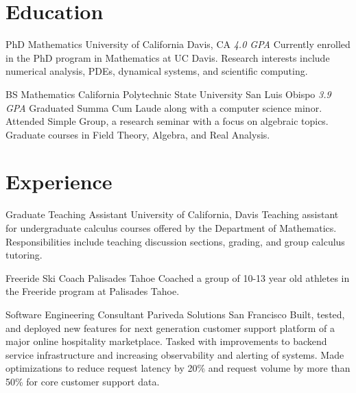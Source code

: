 \documentclass[letterpaper, 11pt, sans]{moderncv}
\begin{document}
\makecvtitle

\section{Education}
        {PhD Mathematics}
        {University of California}
        {Davis, CA}
        {\textit{4.0 GPA}}
        {
            Currently enrolled in the PhD program in Mathematics at UC Davis.\newline
            Research interests include numerical analysis, PDEs, dynamical
            systems, and scientific computing.\newline
        }

        {BS Mathematics}
        {California Polytechnic State University}
        {San Luis Obispo}
        {\textit{3.9 GPA}}
        {
            Graduated Summa Cum Laude along with a computer science minor.\newline
            Attended Simple Group, a research seminar with a focus on algebraic topics.\newline
            Graduate courses in Field Theory, Algebra, and Real Analysis. \newline
        }

\section{Experience}

        {Graduate Teaching Assistant}
        {University of California, Davis}
        {}{}
        {
          Teaching assistant for undergraduate calculus courses offered by the
          Department of Mathematics.\newline
          Responsibilities include teaching discussion sections, grading, and
          group calculus tutoring.\newline
        }

        {Freeride Ski Coach}
        {Palisades Tahoe}
        {}{}
        {
          Coached a group of 10-13 year old athletes in the Freeride program at
          Palisades Tahoe.\newline
        }

        {Software Engineering Consultant}
        {Pariveda Solutions}
        {San Francisco}{}
        {
            Built, tested, and deployed new features for next generation
            customer support platform of a major online hospitality
            marketplace.\newline
            Tasked with improvements to backend service infrastructure and
            increasing observability and alerting of systems.\newline
            Made optimizations to reduce request latency by 20\% and request
            volume by more than 50\% for core customer support data.\newline
        }
\end{document}
